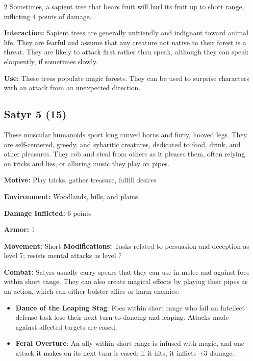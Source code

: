 \begin{multicols}{2}
Sometimes, a sapient tree that bears fruit will hurl its fruit up to short range, inflicting 4 points of damage. 

\textbf{Interaction:} Sapient trees are generally unfriendly and indignant toward animal life. They are fearful and assume that any creature not native to their forest is a threat. They are likely to attack first rather than speak, although they can speak eloquently, if sometimes slowly. 

\textbf{Use:} These trees populate magic forests. They can be used to surprise characters with an attack from an unexpected direction.

\subsection{Satyr 5 (15)}

These muscular humanoids sport long curved horns and furry, hooved legs. They are self-centered, greedy, and sybaritic creatures, dedicated to food, drink, and other pleasures. They rob and steal from others as it pleases them, often relying on tricks and lies, or alluring music they play on pipes. 

\textbf{Motive:} Play tricks, gather treasure, fulfill desires 

\textbf{Environment:} Woodlands, hills, and plains 

\textbf{Damage Inflicted:} 6 points 

\textbf{Armor:} 1 

\textbf{Movement:} Short \textbf{Modifications:} Tasks related to persuasion and deception as level 7; resists mental attacks as level 7 

\textbf{Combat:} Satyrs usually carry spears that they can use in melee and against foes within short range. They can also create magical effects by playing their pipes as an action, which can either bolster allies or harm enemies: 

\begin{itemize}
\item \textbf{Dance of the Leaping Stag}: Foes within short range who fail an Intellect defense task lose their next turn to dancing and leaping. Attacks made against affected targets are eased. 

\item \textbf{Feral Overture}: An ally within short range is infused with magic, and one attack it makes on its next turn is eased; if it hits, it inflicts +3 damage. 


\end{itemize}
\end{multicols}
